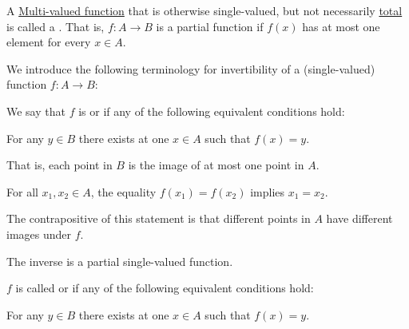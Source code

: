 \begin{definition}\label{def:partial_function}
  A \hyperref[def:multi_valued_function]{Multi-valued function} that is otherwise single-valued, but not necessarily \hyperref[def:multi_valued_function/total]{total} is called a . That is, \( f: A \to B \) is a partial function if \( f(x) \) has at most one element for every \( x \in A \).
\end{definition}

\begin{definition}\label{def:function_invertibility}
  We introduce the following terminology for invertibility of a (single-valued) function \( f: A \to B \):
  \begin{thmenum}
    \begin{minipage}[t]{0.43\textwidth}
       We say that \( f \) is  or  if any of the following equivalent conditions hold:
      \begin{thmenum}
         For any \( y \in B \) there exists at  one \( x \in A \) such that \( f(x) = y \).

        That is, each point in \( B \) is the image of at most one point in \( A \).
        \newline

         For all \( x_1, x_2 \in A \), the equality \( f(x_1) = f(x_2) \) implies \( x_1 = x_2 \).

        The contrapositive of this statement is that different points in \( A \) have different images under \( f \).

         The inverse is a partial single-valued function.
      \end{thmenum}
    \end{minipage}
    \hfill
    \begin{minipage}[t]{0.44\textwidth}
       \( f \) is called  or  if any of the following equivalent conditions hold:
      \newline
      \begin{thmenum}[leftmargin=0.9cm]
         For any \( y \in B \) there exists at  one \( x \in A \) such that \( f(x) = y \).


\end{thmenum}
\end{minipage}
\end{thmenum}
\end{definition}
